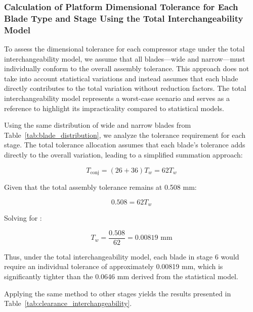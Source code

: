 \subsubsection{Calculation of Platform Dimensional Tolerance for Each Blade Type and Stage Using the Total Interchangeability Model}
\label{subsubsec:clearance_calculation2}

To assess the dimensional tolerance for each compressor stage under the total interchangeability model, we assume that all blades—wide and narrow—must individually conform to the overall assembly tolerance. This approach does not take into account statistical variations and instead assumes that each blade directly contributes to the total variation without reduction factors. The total interchangeability model represents a worst-case scenario and serves as a reference to highlight its impracticality compared to statistical models.

Using the same distribution of wide and narrow blades from Table~\ref{tab:blade_distribution}, we analyze the tolerance requirement for each stage. The total tolerance allocation assumes that each blade's tolerance adds directly to the overall variation, leading to a simplified summation approach:

\begin{equation}
T_{\text{conj}} = (26 + 36) T_w = 62 T_w
\end{equation}

Given that the total assembly tolerance remains at 0.508 mm:

\begin{equation}
0.508 = 62 T_w
\end{equation}

Solving for :

\begin{equation}
T_w = \frac{0.508}{62} = 0.00819 \text{ mm}
\end{equation}

Thus, under the total interchangeability model, each blade in stage 6 would require an individual tolerance of approximately 0.00819 mm, which is significantly tighter than the 0.0646 mm derived from the statistical model.

Applying the same method to other stages yields the results presented in Table~\ref{tab:clearance_interchangeability}.

